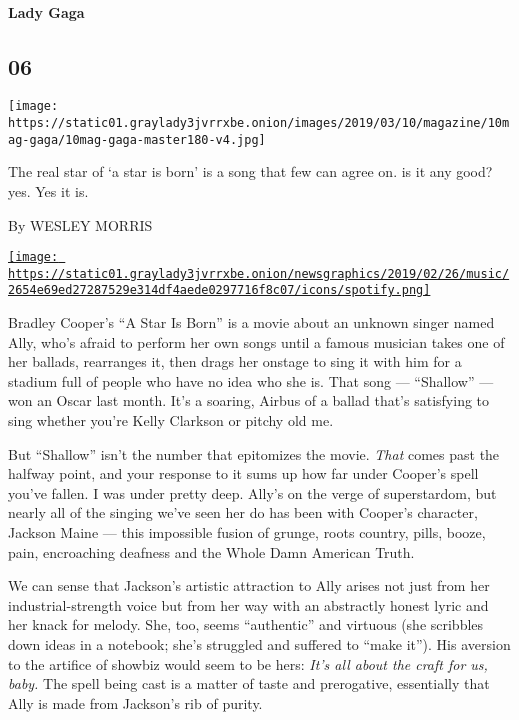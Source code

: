 \hypertarget{lady-gaga}{%
\paragraph{Lady Gaga}\label{lady-gaga}}

\hypertarget{06}{%
\subsection{06}\label{06}}

\texttt{[image: https://static01.graylady3jvrrxbe.onion/images/2019/03/10/magazine/10mag-gaga/10mag-gaga-master180-v4.jpg]}

The real star of `a star is born' is a song that few can agree on. is it
any good? yes. Yes it is.

By WESLEY MORRIS

\href{https://open.spotify.com/track/1sv0BhPPnrUgQ6dziZlmuM}{\texttt{[image: https://static01.graylady3jvrrxbe.onion/newsgraphics/2019/02/26/music/2654e69ed27287529e314df4aede0297716f8c07/icons/spotify.png]}}

Bradley Cooper's ``A Star Is Born'' is a movie about an unknown singer
named Ally, who's afraid to perform her own songs until a famous
musician takes one of her ballads, rearranges it, then drags her onstage
to sing it with him for a stadium full of people who have no idea who
she is. That song --- ``Shallow'' --- won an Oscar last month. It's a
soaring, Airbus of a ballad that's satisfying to sing whether you're
Kelly Clarkson or pitchy old me.

But ``Shallow'' isn't the number that epitomizes the movie. \emph{That}
comes past the halfway point, and your response to it sums up how far
under Cooper's spell you've fallen. I was under pretty deep. Ally's on
the verge of superstardom, but nearly all of the singing we've seen her
do has been with Cooper's character, Jackson Maine --- this impossible
fusion of grunge, roots country, pills, booze, pain, encroaching
deafness and the Whole Damn American Truth.

We can sense that Jackson's artistic attraction to Ally arises not just
from her industrial-strength voice but from her way with an abstractly
honest lyric and her knack for melody. She, too, seems ``authentic'' and
virtuous (she scribbles down ideas in a notebook; she's struggled and
suffered to ``make it''). His aversion to the artifice of showbiz would
seem to be hers: \emph{It's all about the craft for us, baby.} The spell
being cast is a matter of taste and prerogative, essentially that Ally
is made from Jackson's rib of purity.

